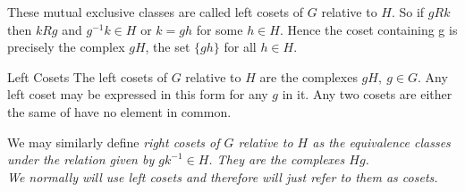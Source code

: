 These mutual exclusive classes are called left cosets of $G$ relative to $H$. So if $gRk$ then $kRg$ and $g^{-1}k \in H$ or $k = gh$ for some $h\in H$. Hence the coset containing g is
precisely the complex $gH$, the set $\{gh\}$ for all $h\in H$.

\begin{theorem}{Left Cosets}
The left cosets of $G$ relative to $H$ are the complexes $gH,~g\in G$. Any left coset may be expressed in this form for any $g$ in it. Any two cosets are either the same of have
no element in common.
\end{theorem}

We may similarly define \it  right cosets \rm of $G$ relative to $H$ as the equivalence classes under the relation given by $gk^{-1}\in H$. They are the complexes $Hg$.\\

We normally will use left cosets and therefore will just refer to them as cosets. 